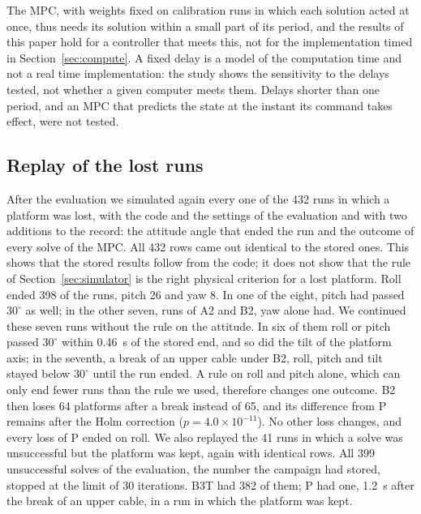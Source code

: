 \documentclass[a4paper,fleqn]{cas-dc}
\begin{document}
The MPC, with weights fixed on calibration runs in which each solution acted at once, thus needs its solution within a small part of its period, and the results of this paper hold for a controller that meets this, not for the implementation timed in Section~\ref{sec:compute}. A fixed delay is a model of the computation time and not a real time implementation: the study shows the sensitivity to the delays tested, not whether a given computer meets them. Delays shorter than one period, and an MPC that predicts the state at the instant its command takes effect, were not tested.

\subsection{Replay of the lost runs}\label{sec:replay}

After the evaluation we simulated again every one of the 432 runs in which a platform was lost, with the code and the settings of the evaluation and with two additions to the record: the attitude angle that ended the run and the outcome of every solve of the MPC. All 432 rows came out identical to the stored ones. This shows that the stored results follow from the code; it does not show that the rule of Section~\ref{sec:simulator} is the right physical criterion for a lost platform. Roll ended 398 of the runs, pitch 26 and yaw 8. In one of the eight, pitch had passed $30^\circ$ as well; in the other seven, runs of A2 and B2, yaw alone had. We continued these seven runs without the rule on the attitude. In six of them roll or pitch passed $30^\circ$ within 0.46~s of the stored end, and so did the tilt of the platform axis; in the seventh, a break of an upper cable under B2, roll, pitch and tilt stayed below $30^\circ$ until the run ended. A rule on roll and pitch alone, which can only end fewer runs than the rule we used, therefore changes one outcome. B2 then loses 64 platforms after a break instead of 65, and its difference from P remains after the Holm correction ($p=4.0\times10^{-11}$). No other loss changes, and every loss of P ended on roll. We also replayed the 41 runs in which a solve was unsuccessful but the platform was kept, again with identical rows. All 399 unsuccessful solves of the evaluation, the number the campaign had stored, stopped at the limit of 30 iterations. B3T had 382 of them; P had one, 1.2~s after the break of an upper cable, in a run in which the platform was kept.

\end{document}
